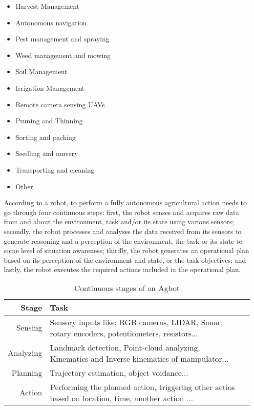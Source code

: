 \documentclass[review]{elsarticle}
\begin{document}
    \begin{itemize}
        \item Harvest Management
        \item Autonomous navigation
        \item Pest management and spraying
        \item Weed management and mowing
        \item Soil Management
        \item Irrigation Management 
        \item Remote camera sensing UAVs
        \item Pruning and Thinning
        \item Sorting and packing
        \item Seedling and nursery
        \item Transporting and cleaning
        \item Other
    \end{itemize}

    According to \cite{Bechar_2009, Oren_2011} a robot, to perform a fully autonomous agricultural action needs to go through four continuous steps: first, the robot senses and acquires raw data from and about the environment, task and/or its state using various sensors; secondly, the robot processes and analyses the data received from its sensors to generate reasoning and a perception of the environment, the task or its state to some level of situation awareness; thirdly, the robot generates an operational plan based on its perception of the environment and state, or the task objectives; and lastly, the robot executes the required actions included in the operational plan.

	\begin{table}[t]
		\centering
        \begin{tabular}{r p{12cm}l}
                Stage               & Task              \\
                \hline
                Sensing             & Sensory inputs like: RGB cameras, LIDAR, Sonar, rotary encoders, potentiometers, resistors...             \\
                Analyzing           & Landmark detection, Point-cloud analyzing, Kinematics and Inverse kinematics of manipulator...            \\
                Planning            & Trajectory estimation, object voidance...      \\
                Action              & Performing the planned action, triggering other actios based on location, time, another action ...        \\
                \hline
        \end{tabular}
        \caption{Continuous stages of an Agbot \cite{Bechar_2016}} \label{tab:autonomy} 
    \end{table}
\end{document}
